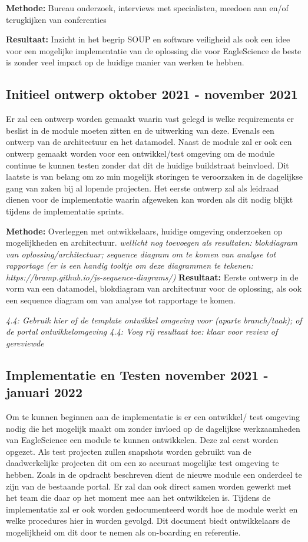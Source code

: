 {\textbf{Methode:} Bureau onderzoek, interviews met specialisten, meedoen aan en/of terugkijken van conferenties

\textbf{Resultaat:} Inzicht in het begrip SOUP en software veiligheid als ook een idee voor een mogelijke implementatie van de oplossing die voor EagleScience de beste is zonder veel impact op de huidige manier van werken te hebben.

\subsection{Initieel ontwerp \textbf{oktober 2021 - november 2021 }}\label{subsec:initieel-ontwerp}
Er zal een ontwerp worden gemaakt waarin vast gelegd is welke requirements er beslist in de module moeten zitten en de uitwerking van deze. Evenals een ontwerp van de architectuur en het datamodel. Naast de module zal er ook een ontwerp gemaakt worden voor een ontwikkel/test omgeving om de module continue te kunnen testen zonder dat dit de huidige buildstraat beinvloed. Dit laatste is van belang om zo min mogelijk storingen te veroorzaken in de dagelijkse gang van zaken bij al lopende projecten. Het eerste ontwerp zal als leidraad dienen voor de implementatie waarin afgeweken kan worden als dit nodig blijkt tijdens de implementatie sprints.

\textbf{Methode:} Overleggen met ontwikkelaars, huidige omgeving onderzoeken op mogelijkheden en architectuur.
\textit{wellicht nog toevoegen als resultaten: blokdiagram van oplossing/architectuur; sequence diagram om te komen van analyse tot rapportage (er is een handig tooltje om deze diagrammen te tekenen: https://bramp.github.io/js-sequence-diagrams/)}
\textbf{Resultaat:} Eerste ontwerp in de vorm van een datamodel, blokdiagram van architectuur voor de oplossing, als ook een sequence diagram om van analyse tot rapportage te komen.

\textit{4.4: Gebruik hier of de template ontwikkel omgeving voor (aparte branch/taak); of de portal ontwikkelomgeving
4.4: Voeg rij resultaat toe: klaar voor review of gereviewde}

\subsection{Implementatie en Testen \textbf{november 2021 - januari 2022 }}\label{subsec:implementatie-en-testen}
Om te kunnen beginnen aan de implementatie is er een ontwikkel/ test omgeving nodig die het mogelijk maakt om zonder invloed op de dagelijkse werkzaamheden van EagleScience een module te kunnen ontwikkelen. Deze zal eerst worden opgezet. Als test projecten zullen snapshots worden gebruikt van de daadwerkelijke projecten dit om een zo accuraat mogelijke test omgeving te hebben. Zoals in de opdracht beschreven dient de nieuwe module een onderdeel te zijn van de bestaande portal. Er zal dan ook direct samen worden gewerkt met het team die daar op het moment mee aan het ontwikkelen is. Tijdens de implementatie zal er ook worden gedocumenteerd wordt hoe de module werkt en welke procedures hier in worden gevolgd. Dit document biedt ontwikkelaars de mogelijkheid om dit door te nemen als on-boarding en referentie.

}
